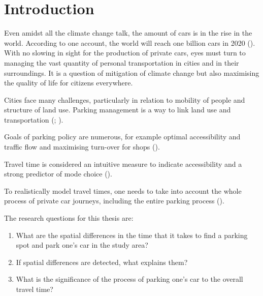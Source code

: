 \section{Introduction}
\justify


Even amidst all the climate change talk, the amount of cars is in the rise in the world. According to one account, the world will reach one billion cars in 2020 (\cite{Sperling2009}). With no slowing in sight for the production of private cars, eyes must turn to managing the vast quantity of personal transportation in cities and in their surroundings. It is a question of mitigation of climate change but also maximising the quality of life for citizens everywhere.

Cities face many challenges, particularly in relation to mobility of people and structure of land use. Parking management is a way to link land use and transportation (\cite{Marsden2006TheReview}; \cite{Diallo2015MethodologyAnalysis}).

Goals of parking policy are numerous, for example optimal accessibility and traffic flow and maximising turn-over for shops (\cite{Marsden2006TheReview}). \par

Travel time is considered an intuitive measure to indicate accessibility and a strong predictor of mode choice (\cite{Frank2008UrbanChoice}).

To realistically model travel times, one needs to take into account the whole process of private car journeys, including the entire parking process (\cite{Salonen2013}).

\bigskip
\noindent
The research questions for this thesis are:

\begin{spacing}{1}
\begin{enumerate}[label=\Roman*] %
  \item What are the spatial differences in the time that it takes to find a parking spot and park one’s car in the study area?
  \item If spatial differences are detected, what explains them?
  \item What is the significance of the process of parking one’s car to the overall travel time?
\end{enumerate}
\end{spacing}